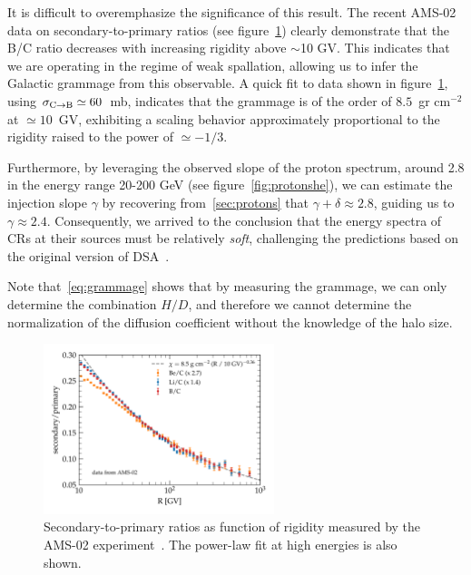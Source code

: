 It is difficult to overemphasize the significance of this result. 
%
The recent AMS-02 data on secondary-to-primary ratios (see figure~\ref{fig:bcams02}) clearly demonstrate that the B/C ratio decreases with increasing rigidity above $\sim$10 GV. %
%
This indicates that we are operating in the regime of weak spallation, allowing us to infer the Galactic grammage from this observable.
%
A quick fit to data shown in figure~\ref{fig:bcams02}, using $\sigma_{\rm C \rightarrow B} \simeq 60$~mb, indicates that the grammage is of the order of $8.5$~gr cm$^{-2}$ at $\simeq 10$~GV, exhibiting a scaling behavior approximately proportional to the rigidity raised to the power of $\simeq -1/3$. 

Furthermore, by leveraging the observed slope of the proton spectrum, around 2.8 in the energy range 20-200 GeV (see figure~\ref{fig:protonshe}), we can estimate the injection slope $\gamma$ by recovering from~\ref{sec:protons} that $\gamma + \delta \approx 2.8$, guiding us to $\gamma \approx 2.4$. 
%
Consequently, we arrived to the conclusion that the energy spectra of CRs at their sources must be relatively \emph{soft}, challenging the predictions based on the original version of DSA~\cite{Capriolilecturenotes}.

Note that~\ref{eq:grammage} shows that by measuring the grammage, we can only determine the combination $H/D$, and therefore we cannot determine the normalization of the diffusion coefficient without the knowledge of the halo size.

\begin{figure}
\centering
\includegraphics[width=0.6\textwidth]{figures/LiBeB_C_AMS02.pdf}
\caption{Secondary-to-primary ratios as function of rigidity measured by the AMS-02 experiment~\cite{AMS02libeb}. The power-law fit at high energies is also shown.}
\label{fig:bcams02}
\end{figure}


